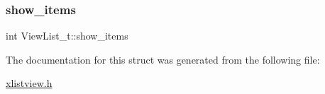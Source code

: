 \mbox{\label{structViewList__t_a9e84cfc6315e8b63e8aa547c0867ecf9}} 
\subsubsection{\texorpdfstring{show\+\_\+items}{show\_items}}
{\footnotesize\ttfamily int View\+List\+\_\+t\+::show\+\_\+items}



The documentation for this struct was generated from the following file\+:\begin{DoxyCompactItemize}
\item 
\hyperlink{xlistview_8h}{xlistview.\+h}\end{DoxyCompactItemize}
